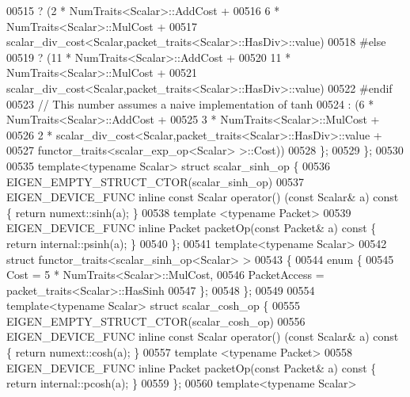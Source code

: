 \begin{DoxyCode}
00515                 ? (2 * NumTraits<Scalar>::AddCost +
00516                    6 * NumTraits<Scalar>::MulCost +
00517                    scalar\_div\_cost<Scalar,packet\_traits<Scalar>::HasDiv>::value)
00518 \textcolor{preprocessor}{#else}
00519                 ? (11 * NumTraits<Scalar>::AddCost +
00520                    11 * NumTraits<Scalar>::MulCost +
00521                    scalar\_div\_cost<Scalar,packet\_traits<Scalar>::HasDiv>::value)
00522 #endif
00523                 \textcolor{comment}{// This number assumes a naive implementation of tanh}
00524                 : (6 * NumTraits<Scalar>::AddCost +
00525                    3 * NumTraits<Scalar>::MulCost +
00526                    2 * scalar\_div\_cost<Scalar,packet\_traits<Scalar>::HasDiv>::value +
00527                    functor\_traits<scalar\_exp\_op<Scalar> >::Cost))
00528   \};
00529 \};
00530 
00535 \textcolor{keyword}{template}<\textcolor{keyword}{typename} Scalar> \textcolor{keyword}{struct }scalar\_sinh\_op \{
00536   EIGEN\_EMPTY\_STRUCT\_CTOR(scalar\_sinh\_op)
00537   EIGEN\_DEVICE\_FUNC \textcolor{keyword}{inline} \textcolor{keyword}{const} Scalar operator() (\textcolor{keyword}{const} Scalar& a)\textcolor{keyword}{ const }\{ \textcolor{keywordflow}{return} numext::sinh(a); \}
00538   \textcolor{keyword}{template} <\textcolor{keyword}{typename} Packet>
00539   EIGEN\_DEVICE\_FUNC \textcolor{keyword}{inline} Packet packetOp(\textcolor{keyword}{const} Packet& a)\textcolor{keyword}{ const }\{ \textcolor{keywordflow}{return} internal::psinh(a); \}
00540 \};
00541 \textcolor{keyword}{template}<\textcolor{keyword}{typename} Scalar>
00542 \textcolor{keyword}{struct }functor\_traits<scalar\_sinh\_op<Scalar> >
00543 \{
00544   \textcolor{keyword}{enum} \{
00545     Cost = 5 * NumTraits<Scalar>::MulCost,
00546     PacketAccess = packet\_traits<Scalar>::HasSinh
00547   \};
00548 \};
00549 
00554 \textcolor{keyword}{template}<\textcolor{keyword}{typename} Scalar> \textcolor{keyword}{struct }scalar\_cosh\_op \{
00555   EIGEN\_EMPTY\_STRUCT\_CTOR(scalar\_cosh\_op)
00556   EIGEN\_DEVICE\_FUNC \textcolor{keyword}{inline} \textcolor{keyword}{const} Scalar operator() (\textcolor{keyword}{const} Scalar& a)\textcolor{keyword}{ const }\{ \textcolor{keywordflow}{return} numext::cosh(a); \}
00557   \textcolor{keyword}{template} <\textcolor{keyword}{typename} Packet>
00558   EIGEN\_DEVICE\_FUNC \textcolor{keyword}{inline} Packet packetOp(\textcolor{keyword}{const} Packet& a)\textcolor{keyword}{ const }\{ \textcolor{keywordflow}{return} internal::pcosh(a); \}
00559 \};
00560 \textcolor{keyword}{template}<\textcolor{keyword}{typename} Scalar>

\end{DoxyCode}
